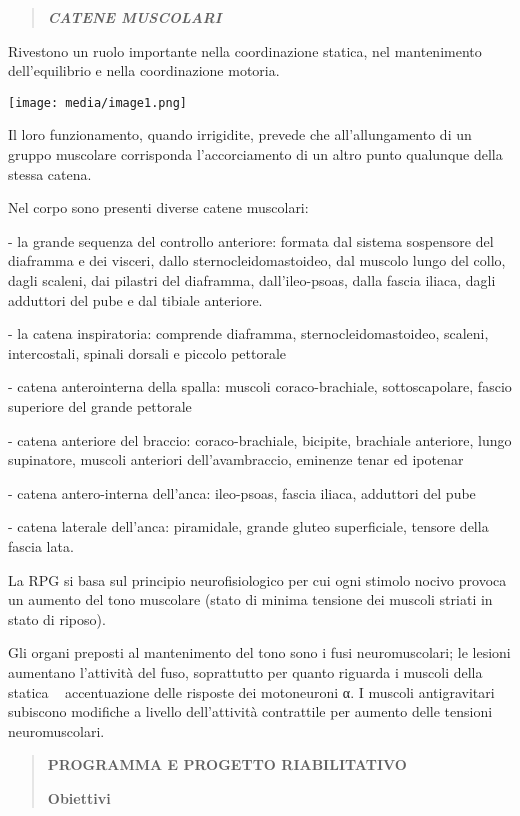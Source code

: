 \documentclass[]{article}
\begin{document}
\begin{quote}
\textbf{\emph{CATENE MUSCOLARI}}
\end{quote}

Rivestono un ruolo importante nella coordinazione statica, nel
mantenimento dell'equilibrio e nella coordinazione motoria.

\texttt{[image: media/image1.png]}

Il loro funzionamento, quando irrigidite, prevede che all'allungamento
di un gruppo muscolare corrisponda l'accorciamento di un altro punto
qualunque della stessa catena.

Nel corpo sono presenti diverse catene muscolari:

- la grande sequenza del controllo anteriore: formata dal sistema
sospensore del diaframma e dei visceri, dallo sternocleidomastoideo, dal
muscolo lungo del collo, dagli scaleni, dai pilastri del diaframma,
dall'ileo-psoas, dalla fascia iliaca, dagli adduttori del pube e dal
tibiale anteriore.

- la catena inspiratoria: comprende diaframma, sternocleidomastoideo,
scaleni, intercostali, spinali dorsali e piccolo pettorale

- catena anterointerna della spalla: muscoli coraco-brachiale,
sottoscapolare, fascio superiore del grande pettorale

- catena anteriore del braccio: coraco-brachiale, bicipite, brachiale
anteriore, lungo supinatore, muscoli anteriori dell'avambraccio,
eminenze tenar ed ipotenar

- catena antero-interna dell'anca: ileo-psoas, fascia iliaca, adduttori
del pube

- catena laterale dell'anca: piramidale, grande gluteo superficiale,
tensore della fascia lata.

La RPG si basa sul principio neurofisiologico per cui ogni stimolo
nocivo provoca un aumento del tono muscolare (stato di minima tensione
dei muscoli striati in stato di riposo).

Gli organi preposti al mantenimento del tono sono i fusi neuromuscolari;
le lesioni aumentano l'attività del fuso, soprattutto per quanto
riguarda i muscoli della statica accentuazione delle risposte dei
motoneuroni α. I muscoli antigravitari subiscono modifiche a livello
dell'attività contrattile per aumento delle tensioni neuromuscolari.

\begin{quote}
\textbf{PROGRAMMA E PROGETTO RIABILITATIVO}

\textbf{Obiettivi}
\end{quote}
\end{document}
